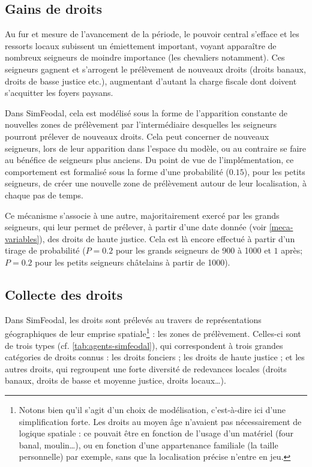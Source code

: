 \subsection{Gains de droits}

Au fur et mesure de l'avancement de la période, le pouvoir central s'efface et les ressorts locaux subissent un émiettement important, voyant apparaître de nombreux seigneurs de moindre importance (les chevaliers notamment).
Ces seigneurs gagnent et s'arrogent le prélèvement de nouveaux droits (droits banaux, droits de basse justice etc.), augmentant d'autant la charge fiscale dont doivent s'acquitter les foyers paysans.

Dans SimFeodal, cela est modélisé sous la forme de l'apparition constante de nouvelles zones de prélèvement par l'intermédiaire desquelles les seigneurs pourront prélever de nouveaux droits.
Cela peut concerner de nouveaux seigneurs, lors de leur apparition dans l'espace du modèle, ou au contraire se faire au bénéfice de seigneurs plus anciens.
Du point de vue de l'implémentation, ce comportement est formalisé sous la forme d'une probabilité ($0.15$), pour les petits seigneurs, de créer une nouvelle zone de prélèvement autour de leur localisation, à chaque pas de temps.

Ce mécanisme s'associe à une autre, majoritairement exercé par les grands seigneurs, qui leur permet de prélever, à partir d'une date donnée (voir \cref{meca-variables}), des droits de haute justice.
Cela est là encore effectué à partir d'un tirage de probabilité ($P = 0.2$ pour les grands seigneurs de 900 à 1000 et $1$ après; $P = 0.2$ pour les petits seigneurs châtelains à partir de 1000).

\subsection{Collecte des droits}

Dans SimFeodal, les droits sont prélevés au travers de représentations géographiques de leur emprise spatiale\footnote{
Notons bien qu'il s'agit d'un choix de modélisation, c'est-à-dire ici d'une simplification forte.
Les droits au moyen âge n'avaient pas nécessairement de logique spatiale : ce pouvait être en fonction de l'usage d'un matériel (four banal, moulin\ldots), ou en fonction d'une appartenance familiale (la \og taille\fg{} personnelle) par exemple, sans que la localisation précise n'entre en jeu.
} : les zones de prélèvement.
Celles-ci sont de trois types (cf. \cref{tab:agents-simfeodal}), qui correspondent à trois grandes catégories de droits connus : les droits fonciers ; les droits de haute justice ; et les autres droits, qui regroupent une forte diversité de redevances locales (droits banaux, droits de basse et moyenne justice, droits locaux\ldots).

